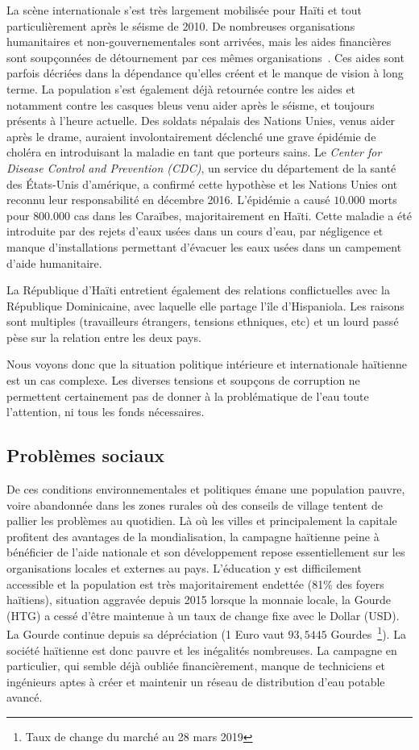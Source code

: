 \documentclass{EPL-master-thesis-covers-FR}
\begin{document}
				La scène internationale s'est très largement mobilisée pour Haïti et tout particulièrement après le séisme de 2010. De nombreuses organisations humanitaires et non-gouvernementales sont arrivées, mais les aides financières sont soupçonnées de détournement par ces mêmes organisations~\cite{ref:analyse_contextuelle_commune}. Ces aides sont parfois décriées dans la dépendance qu'elles créent et le manque de vision à long terme. La population s'est également déjà retournée contre les aides et notamment contre les casques bleus venu aider après le séisme, et toujours présents à l'heure actuelle. Des soldats népalais des Nations Unies, venus aider après le drame, auraient involontairement déclenché une grave épidémie de choléra en introduisant la maladie en tant que porteurs sains. Le \emph{Center for Disease Control and Prevention (CDC)}, un service du département de la santé des \'Etats-Unis d'amérique, a confirmé cette hypothèse et les Nations Unies ont reconnu leur responsabilité en décembre 2016. L'épidémie a causé $10.000$ morts pour $800.000$ cas dans les Caraïbes, majoritairement en Haïti. Cette maladie a été introduite par des rejets d'eaux usées dans un cours d'eau, par négligence et manque d'installations permettant d'évacuer les eaux usées dans un campement d'aide humanitaire.

				La République d'Haïti entretient également des relations conflictuelles avec la République Dominicaine, avec laquelle elle partage l'île d'Hispaniola. Les raisons sont multiples (travailleurs étrangers, tensions ethniques, etc) et un lourd passé pèse sur la relation entre les deux pays.

				Nous voyons donc que la situation politique intérieure et internationale haïtienne est un cas complexe. Les diverses tensions et soupçons de corruption ne permettent certainement pas de donner à la problématique de l'eau toute l'attention, ni tous les fonds nécessaires.

			\subsection*{Problèmes sociaux}

				De ces conditions environnementales et politiques émane une population pauvre, voire abandonnée dans les zones rurales où des conseils de village tentent de pallier les problèmes au quotidien. Là où les villes et principalement la capitale profitent des avantages de la mondialisation, la campagne haïtienne peine à bénéficier de l'aide nationale et son développement repose essentiellement sur les organisations locales et externes au pays. L'éducation y est difficilement accessible et la population est très majoritairement endettée (81\% des foyers haïtiens), situation aggravée depuis 2015 lorsque la monnaie locale, la Gourde (HTG) a cessé d'être maintenue à un taux de change fixe avec le Dollar (USD). La Gourde continue depuis sa dépréciation (1 Euro vaut $93,5445$ Gourdes~\footnote{Taux de change du marché au 28 mars 2019}). La société haïtienne est donc pauvre et les inégalités nombreuses. La campagne en particulier, qui semble déjà oubliée financièrement, manque de techniciens et ingénieurs aptes à créer et maintenir un réseau de distribution d'eau potable avancé.
\end{document}
